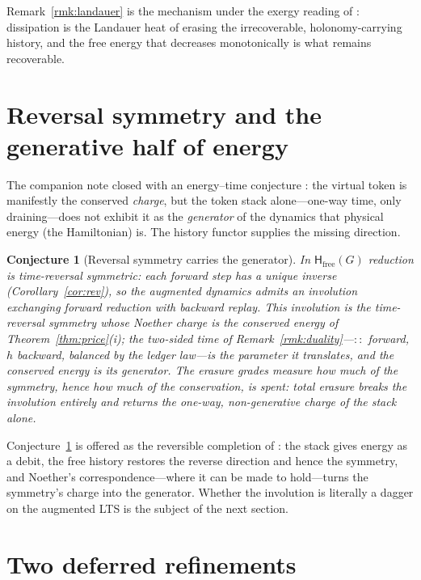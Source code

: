 \documentclass[11pt]{article}
\theoremstyle{definition}
\theoremstyle{plain}
\newtheorem{conjecture}[definition]{Conjecture}
\theoremstyle{remark}
\newcommand{\hist}{\mathsf{H}}
\begin{document}
Remark~\ref{rmk:landauer} is the mechanism under the exergy reading of \cite[\S7]{VT}: dissipation
is the Landauer heat of erasing the irrecoverable, holonomy-carrying history, and the free energy
that decreases monotonically is what remains recoverable.

\section{Reversal symmetry and the generative half of energy}
\label{sec:noether}

The companion note closed with an energy--time conjecture \cite[Conj.~8.1]{VT}: the virtual token is
manifestly the conserved \emph{charge}, but the token stack alone---one-way time, only draining---does
not exhibit it as the \emph{generator} of the dynamics that physical energy (the Hamiltonian) is.
The history functor supplies the missing direction.

\begin{conjecture}[Reversal symmetry carries the generator]\label{conj:noether}
In $\hist_{\mathrm{free}}(G)$ reduction is time-reversal symmetric: each forward step has a unique
inverse (Corollary~\ref{cor:rev}), so the augmented dynamics admits an involution exchanging
forward reduction with backward replay. This involution is the time-reversal symmetry whose Noether
\cite{Noether} charge is the conserved energy of Theorem~\ref{thm:price}(i); the two-sided time of
Remark~\ref{rmk:duality}---$::$ forward, $h$ backward, balanced by the ledger law---is the parameter
it translates, and the conserved energy is its generator. The erasure grades measure how much of the
symmetry, hence how much of the conservation, is spent: total erasure breaks the involution
entirely and returns the one-way, non-generative charge of the stack alone.
\end{conjecture}

Conjecture~\ref{conj:noether} is offered as the reversible completion of \cite[Conj.~8.1]{VT}: the
stack gives energy as a debit, the free history restores the reverse direction and hence the
symmetry, and Noether's correspondence---where it can be made to hold---turns the symmetry's charge
into the generator. Whether the involution is literally a dagger on the augmented LTS is the
subject of the next section.

\section{Two deferred refinements}
\label{sec:further}
\end{document}
